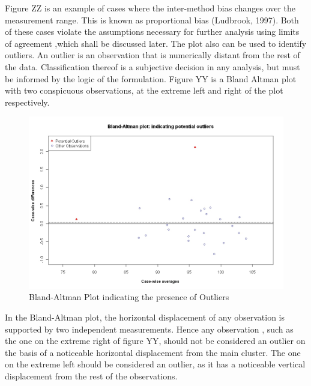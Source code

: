 \documentclass[12pt, a4paper]{report}
\begin{document}

\newpage
Figure ZZ is an example of cases where the inter-method bias changes over the measurement range. This is known as proportional
bias (Ludbrook, 1997). Both of these cases violate the assumptions necessary for further analysis using limits of agreement ,which
shall be discussed later. The plot also can be used to identify outliers. An outlier is an observation that is numerically distant
from the rest of the data. Classification thereof is a subjective decision in any analysis, but must be informed by the logic of the
formulation. Figure YY is a Bland Altman plot with two conspicuous observations, at the extreme left and right of the plot
respectively.


\begin{figure}[h!]
\begin{center}
  \includegraphics[width=125mm]{BAOutliers.jpeg}
  \caption{Bland-Altman Plot indicating the presence of Outliers}\label{PropBias}
\end{center}
\end{figure}

In the Bland-Altman plot, the horizontal displacement of any observation is supported by two independent measurements. Hence
any observation , such as the one on the extreme right of figure YY, should not be considered an outlier on the basis of a
noticeable horizontal displacement from the main cluster. The one on the extreme left should be considered an outlier, as it has a
noticeable vertical displacement from the rest of the observations.
\end{document}
